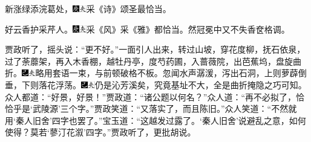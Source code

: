 新涨绿添浣葛处，{\includegraphics[width=3mm]{../Images/00004}\includegraphics[width=3mm]{../Images/00012}\footnotesize \kaishu 采《诗》颂圣最恰当。}

好云香护采芹人。{\includegraphics[width=3mm]{../Images/00004}\includegraphics[width=3mm]{../Images/00012}\footnotesize \kaishu 采《风》采《雅》都恰当。然冠冕中又不失香奁格调。}

贾政听了，摇头说：“更不好。”一面引人出来，转过山坡，穿花度柳，抚石依泉，过了荼蘼架，再入木香棚，越牡丹亭，度芍药圃，入蔷薇院，出芭蕉坞，盘旋曲折。{\includegraphics[width=3mm]{../Images/00003}\includegraphics[width=3mm]{../Images/00012}\footnotesize \kaishu 略用套语一束，与前顿破格不板。}忽闻水声潺湲，泻出石洞，上则萝薜倒垂，下则落花浮荡。{\includegraphics[width=3mm]{../Images/00003}\includegraphics[width=3mm]{../Images/00012}\footnotesize \kaishu 仍是沁芳溪矣，究竟基址不大，全是曲折掩隐之巧可知。}众人都道：“好景，好景！”贾政道：“诸公题以何名？”众人道：“再不必拟了，恰恰乎是‘武陵源’三个字。”贾政笑道：“又落实了，而且陈旧。”众人笑道：“不然就用‘秦人旧舍’四字也罢了。”宝玉道：“这越发过露了。‘秦人旧舍’说避乱之意，如何使得？莫若‘蓼汀花溆’四字。”贾政听了，更批胡说。

